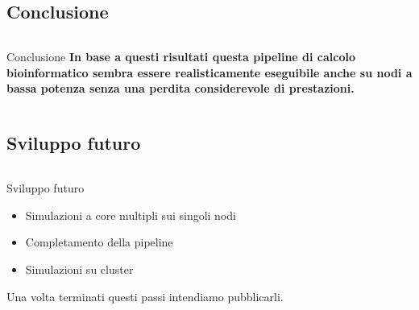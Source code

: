 \documentclass{beamer}
\begin{document}
\subsection{Conclusione}
\begin{frame}
\begin{columns}
\begin{column}{0.8\linewidth}	
\begin{block}{Conclusione}
\textbf{In base a questi risultati questa pipeline di calcolo bioinformatico sembra
essere realisticamente eseguibile anche su nodi a bassa potenza senza una
perdita considerevole di prestazioni.}
\end{block}
\end{column}
\end{columns}
\end{frame}

\subsection{Sviluppo futuro}
\begin{frame}
\begin{columns}
\begin{column}{0.8\linewidth}	
\begin{block}{Sviluppo futuro}
\begin{itemize}
\item Simulazioni a core multipli sui singoli nodi
\item Completamento della pipeline
\item Simulazioni su cluster
\end{itemize}
\end{block}
\begin{block}{}
Una volta terminati questi passi intendiamo pubblicarli.
\end{block}
\end{column}
\end{columns}
\end{frame}
\end{document}
